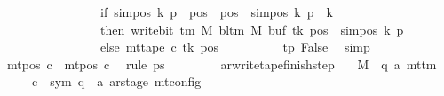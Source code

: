 \begin{isabellebody}
\ \ \ \ \ \ \ \ \ \ \ \ \ \ \ \ if\ sim{\isacharunderscore}{\kern0pt}pos\ {\isacharquery}{\kern0pt}k\ p\ {\isasymle}\ pos\ {\isasymand}\ pos\ {\isacharless}{\kern0pt}\ sim{\isacharunderscore}{\kern0pt}pos\ {\isacharquery}{\kern0pt}k\ p\ {\isacharplus}{\kern0pt}\ {\isacharquery}{\kern0pt}k\isanewline
\ \ \ \ \ \ \ \ \ \ \ \ \ \ \ \ then\ write{\isacharunderscore}{\kern0pt}bit\ {\isacharparenleft}{\kern0pt}{\isasymGamma}{\isacharunderscore}{\kern0pt}tm\ M{\isacharparenright}{\kern0pt}\ {\isacharparenleft}{\kern0pt}bl{\isacharunderscore}{\kern0pt}tm\ M{\isacharparenright}{\kern0pt}\ {\isacharparenleft}{\kern0pt}buf\ tk{\isacharparenright}{\kern0pt}\ {\isacharparenleft}{\kern0pt}pos\ {\isacharminus}{\kern0pt}\ sim{\isacharunderscore}{\kern0pt}pos\ {\isacharquery}{\kern0pt}k\ p{\isacharparenright}{\kern0pt}\isanewline
\ \ \ \ \ \ \ \ \ \ \ \ \ \ \ \ else\ mt{\isacharunderscore}{\kern0pt}tape\ c{\isacharprime}{\kern0pt}\ tk\ pos{\isacharparenright}{\kern0pt}{\isacharparenright}{\kern0pt}{\isacharparenright}{\kern0pt}{\isachardoublequoteclose}\isanewline
\ \ \ \ \ \ \ \ \isamarkupfalse%
\ tp\ False\ \isamarkupfalse%
\ simp\isanewline
\ \ \ \ \ \ \isamarkupfalse%
\ {\isachardoublequoteopen}mt{\isacharunderscore}{\kern0pt}pos\ c{\isacharprime}{\kern0pt}{\isacharprime}{\kern0pt}\ {\isacharequal}{\kern0pt}\ mt{\isacharunderscore}{\kern0pt}pos\ c{\isacharprime}{\kern0pt}{\isachardoublequoteclose}\ \isamarkupfalse%
\ {\isacharparenleft}{\kern0pt}rule\ ps{\isacharprime}{\kern0pt}{\isacharparenright}{\kern0pt}\isanewline
\ \ \ \ \isamarkupfalse%
\isanewline
\ \ \isamarkupfalse%
\isanewline
{}\isamarkupfalse%
%
\endisatagproof
{\isafoldproof}%
%
\isadelimproof
\isanewline
%
\endisadelimproof
\isanewline
{}\isamarkupfalse%
\ ar{\isacharunderscore}{\kern0pt}write{\isacharunderscore}{\kern0pt}tape{\isacharunderscore}{\kern0pt}finish{\isacharunderscore}{\kern0pt}step{\isacharcolon}{\kern0pt}\isanewline
\ \ \ M\ {\isacharcolon}{\kern0pt}{\isacharcolon}{\kern0pt}\ {\isachardoublequoteopen}{\isacharparenleft}{\kern0pt}{\isacharprime}{\kern0pt}q{\isacharcomma}{\kern0pt}\ {\isacharprime}{\kern0pt}a{\isacharparenright}{\kern0pt}\ mttm{\isachardoublequoteclose}\isanewline
\ \ \ \ \ c{\isacharprime}{\kern0pt}\ {\isacharcolon}{\kern0pt}{\isacharcolon}{\kern0pt}\ {\isachardoublequoteopen}{\isacharparenleft}{\kern0pt}sym{}{\isacharcomma}{\kern0pt}\ {\isacharprime}{\kern0pt}q\ {\isasymtimes}\ {\isacharprime}{\kern0pt}a\ ar{\isacharunderscore}{\kern0pt}stage{\isacharparenright}{\kern0pt}\ mt{\isacharunderscore}{\kern0pt}config{\isachardoublequoteclose}\isanewline

\end{isabellebody}
